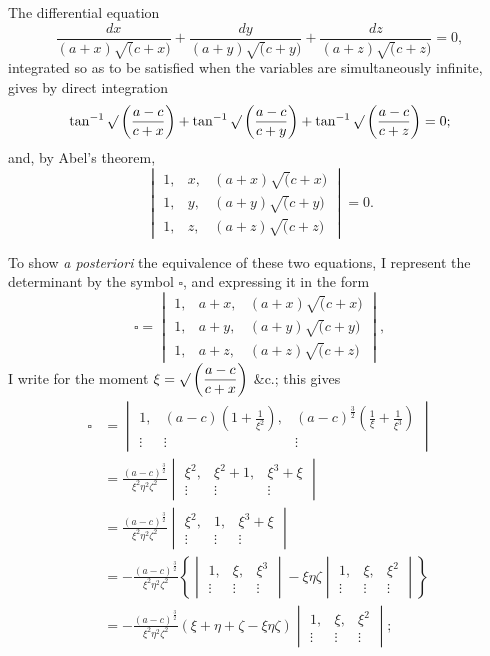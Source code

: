 \documentclass[11pt]{article}
\begin{document}
The differential equation
\[
\frac{dx}{(a+x)\surd(c+x)} + \frac{dy}{(a+y)\surd(c+y)} + \frac{dz}{(a+z)\surd(c+z)} = 0,
\]
integrated so as to be satisfied when the variables are simultaneously infinite, gives by direct integration
\[
\tan^{-1}\surd\left(\frac{a-c}{c+x}\right) + \tan^{-1}\surd\left(\frac{a-c}{c+y}\right) + \tan^{-1}\surd\left(\frac{a-c}{c+z}\right) = 0;
\]
and, by Abel's theorem,
\[
\begin{vmatrix}
1, & x, & (a+x)\surd(c+x) \\
1, & y, & (a+y)\surd(c+y) \\
1, & z, & (a+z)\surd(c+z)
\end{vmatrix} = 0.
\]

To show \textit{a posteriori} the equivalence of these two equations, I represent the determinant by the symbol $\square$, and expressing it in the form
\[
\square =
\begin{vmatrix}
1, & a+x, & (a+x)\surd(c+x) \\
1, & a+y, & (a+y)\surd(c+y) \\
1, & a+z, & (a+z)\surd(c+z)
\end{vmatrix},
\]
I write for the moment $\xi = \surd\left(\dfrac{a-c}{c+x}\right)$ \&c.; this gives
\begin{align*}
\square &=
\begin{vmatrix}
1, & (a-c)\left(1+\frac{1}{\xi^2}\right), & (a-c)^{\frac{3}{2}}\left(\frac{1}{\xi}+\frac{1}{\xi^3}\right) \\
\vdots & \vdots & \vdots
\end{vmatrix}\\
&= \frac{(a-c)^{\frac{3}{2}}}{\xi^2\eta^2\zeta^2}
\begin{vmatrix}
\xi^2, & \xi^2+1, & \xi^3+\xi \\
\vdots & \vdots & \vdots
\end{vmatrix}\\
&= \frac{(a-c)^{\frac{3}{2}}}{\xi^2\eta^2\zeta^2}
\begin{vmatrix}
\xi^2, & 1, & \xi^3+\xi \\
\vdots & \vdots & \vdots
\end{vmatrix}\\
&= -\frac{(a-c)^{\frac{3}{2}}}{\xi^2\eta^2\zeta^2}
\left\{
\begin{vmatrix}
1, & \xi, & \xi^3 \\
\vdots & \vdots & \vdots
\end{vmatrix}
- \xi\eta\zeta
\begin{vmatrix}
1, & \xi, & \xi^2 \\
\vdots & \vdots & \vdots
\end{vmatrix}
\right\}\\
&= -\frac{(a-c)^{\frac{3}{2}}}{\xi^2\eta^2\zeta^2}(\xi+\eta+\zeta-\xi\eta\zeta)
\begin{vmatrix}
1, & \xi, & \xi^2 \\
\vdots & \vdots & \vdots
\end{vmatrix};
\end{align*}
\end{document}
